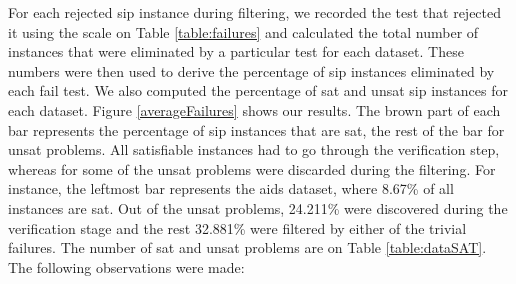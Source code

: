 \documentclass{l4proj}
\begin{document}
For each rejected \gls{sip} instance during filtering, we recorded the test that rejected it using the scale on Table \ref{table:failures} and calculated the total number of instances that were eliminated by a particular test for each dataset. These numbers were then used to derive the percentage of \gls{sip} instances eliminated by each fail test. We also computed the percentage of \gls{sat} and \gls{unsat} \gls{sip} instances for each dataset. Figure \ref{averageFailures} shows our results. The brown part of each bar represents the percentage of \gls{sip} instances that are \gls{sat}, the rest of the bar for \gls{unsat} problems. All satisfiable instances had to go through the verification step, whereas for some of the \gls{unsat} problems were discarded during the filtering. For instance, the leftmost bar represents the aids dataset, where 8.67\% of all instances are \gls{sat}. Out of the \gls{unsat} problems, 24.211\% were discovered during the verification stage and the rest 32.881\% were filtered by either of the trivial failures. The number of \gls{sat} and \gls{unsat} problems are on Table \ref{table:dataSAT}. The following observations were made:
\end{document}
